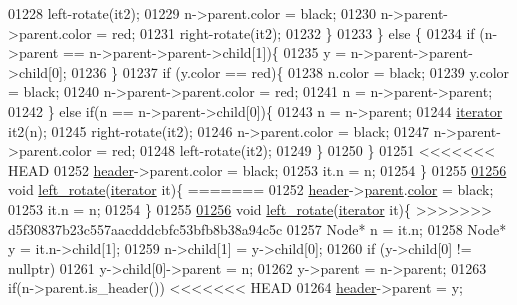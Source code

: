 \begin{DoxyCode}
01228         left-rotate(it2);
01229         n->parent.color = black;
01230         n->parent->parent.color = red;
01231         right-rotate(it2);
01232         \}
01233     \} \textcolor{keywordflow}{else} \{
01234         \textcolor{keywordflow}{if} (n->parent == n->parent->parent->child[1])\{
01235         y = n->parent->parent->child[0];
01236     \}
01237     \textcolor{keywordflow}{if} (y.color == red)\{
01238         n.color = black;
01239         y.color = black;
01240         n->parent->parent.color = red;
01241         n = n->parent->parent;
01242     \} \textcolor{keywordflow}{else} \textcolor{keywordflow}{if}(n == n->parent->child[0])\{
01243         n = n->parent;
01244         \hyperlink{classaed2_1_1iterator}{iterator} it2(n);
01245         right-rotate(it2);
01246         n->parent.color = black;
01247         n->parent->parent.color = red;
01248         left-rotate(it2);
01249     \}
01250 \}
01251 
<<<<<<< HEAD
01252     \hyperlink{classaed2_1_1map_a92d93f905c8ad73fba18fdc7e8915cce_a92d93f905c8ad73fba18fdc7e8915cce}{header}->parent.color = black;
01253     it.n = n;
01254 \}
01255 
\hypertarget{map2_8h_source_l01256}{}\hyperlink{classaed2_1_1map_a1f4b383ece3e22680802d27aa11b623a_a1f4b383ece3e22680802d27aa11b623a}{01256} \textcolor{keywordtype}{void} \hyperlink{classaed2_1_1map_a1f4b383ece3e22680802d27aa11b623a_a1f4b383ece3e22680802d27aa11b623a}{left_rotate}(\hyperlink{classaed2_1_1iterator}{iterator} it)\{
=======
01252     \hyperlink{classaed2_1_1map_a92d93f905c8ad73fba18fdc7e8915cce_a92d93f905c8ad73fba18fdc7e8915cce}{header}->\hyperlink{structaed2_1_1map_1_1Node_a91a1855da19d22344bc89c2f8b998a7a_a91a1855da19d22344bc89c2f8b998a7a}{parent}.\hyperlink{structaed2_1_1map_1_1Node_a58dd9993fee8ee3eaa5716b72a3eca47_a58dd9993fee8ee3eaa5716b72a3eca47}{color} = black;
01253     it.n = n;
01254 \}
01255 
\hyperlink{classaed2_1_1map_a1f4b383ece3e22680802d27aa11b623a_a1f4b383ece3e22680802d27aa11b623a}{01256} \textcolor{keywordtype}{void} \hyperlink{classaed2_1_1map_a1f4b383ece3e22680802d27aa11b623a_a1f4b383ece3e22680802d27aa11b623a}{left\_rotate}(\hyperlink{classaed2_1_1iterator}{iterator} it)\{
>>>>>>> d5f30837b23c557aacdddcbfc53bfb8b38a94c5c
01257     Node* n = it.n;
01258     Node* y = it.n->child[1];
01259     n->child[1] = y->child[0];
01260     \textcolor{keywordflow}{if} (y->child[0] != \textcolor{keyword}{nullptr})
01261         y->child[0]->parent = n;
01262     y->parent = n->parent;
01263     \textcolor{keywordflow}{if}(n->parent.is\_header())
<<<<<<< HEAD
01264         \hyperlink{classaed2_1_1map_a92d93f905c8ad73fba18fdc7e8915cce_a92d93f905c8ad73fba18fdc7e8915cce}{header}->parent = y;

\end{DoxyCode}
